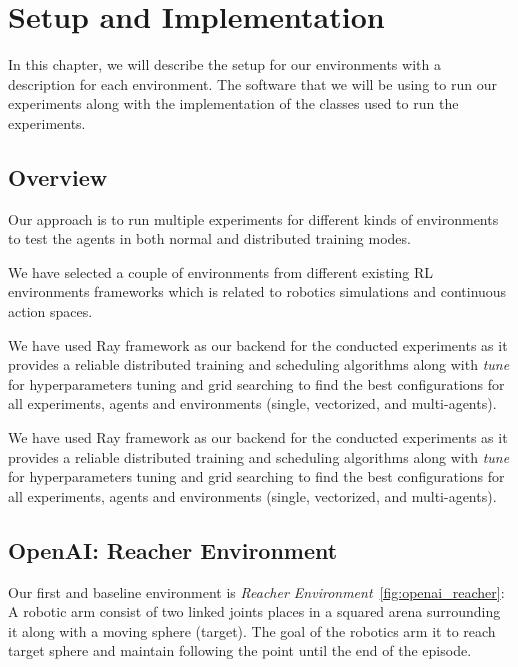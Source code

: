 
\chapter{Setup and Implementation}\label{chapter:setup_and_implementation}

In this chapter, we will describe the setup for our environments with a description for each environment. The software that we will be using to run our experiments along with the implementation of the classes used to run the experiments.

\section{Overview}
Our approach is to run multiple experiments for different kinds of environments to test the agents in both normal and distributed training modes.

We have selected a couple of environments from different existing RL environments frameworks which is related to robotics simulations and continuous action spaces.

We have used Ray framework as our backend for the conducted experiments as it provides a reliable distributed training and scheduling algorithms along with \textit{tune} for hyperparameters tuning and grid searching to find the best configurations for all experiments, agents and environments (single, vectorized, and multi-agents).

We have used Ray framework as our backend for the conducted experiments as it provides a reliable distributed training and scheduling algorithms along with \textit{tune} for hyperparameters tuning and grid searching to find the best configurations for all experiments, agents and environments (single, vectorized, and multi-agents).

\clearpage

\section{OpenAI: Reacher Environment}

Our first and baseline environment is \textit{Reacher Environment}~\ref{fig:openai_reacher}: A robotic arm consist of two linked joints places in a squared arena surrounding it along with a moving sphere (target). The goal of the robotics arm it to reach target sphere and maintain following the point until the end of the episode. 

